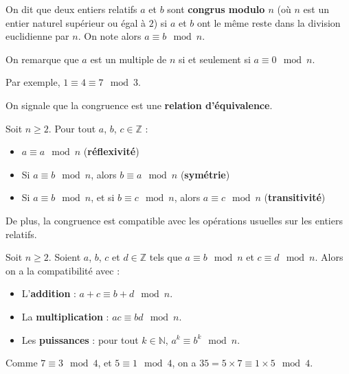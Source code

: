 	\begin{formula}[Définition]
		On dit que deux entiers relatifs $a$ et $b$ sont \textbf{congrus modulo $n$} (où $n$ est un entier naturel supérieur ou égal à $2$) si $a$ et $b$ ont le même reste dans la division euclidienne par $n$. On note alors $a \equiv b \mod n$.
	\end{formula}

	\begin{tip}
		On remarque que $a$ est un multiple de $n$ si et seulement si $a \equiv 0 \mod n$.
	\end{tip}

	\begin{tip}[Exemple]
		Par exemple, $1 \equiv 4 \equiv 7 \mod 3$.
	\end{tip}

	On signale que la congruence est une \textbf{relation d'équivalence}.

	\begin{formula}[Propriétés]
		Soit $n \geq 2$. Pour tout $a$, $b$, $c \in \mathbb{Z}$ :
		\begin{itemize}
			\item $a \equiv a \mod n$ (\textbf{réflexivité})
			\item Si $a \equiv b \mod n$, alors $b \equiv a \mod n$ (\textbf{symétrie})
			\item Si $a \equiv b \mod n$, et si $b \equiv c \mod n$, alors $a \equiv c \mod n$ (\textbf{transitivité})
		\end{itemize}
	\end{formula}

	De plus, la congruence est compatible avec les opérations usuelles sur les entiers relatifs.

	\begin{formula}[Propriétés]
		Soit $n \geq 2$. Soient $a$, $b$, $c$ et $d \in \mathbb{Z}$ tels que $a \equiv b \mod n$ et $c \equiv d \mod n$. Alors on a la compatibilité avec :
		\begin{itemize}
			\item L'\textbf{addition} : $a + c \equiv b + d \mod n$.
			\item La \textbf{multiplication} : $ac \equiv bd \mod n$.
			\item Les \textbf{puissances} : pour tout $k \in \mathbb{N}$, $a^k \equiv b^k \mod n$.
		\end{itemize}
	\end{formula}

	\begin{tip}[Exemple]
		Comme $7 \equiv 3 \mod 4$, et $5 \equiv 1 \mod 4$, on a $35 = 5 \times 7 \equiv 1 \times 5 \mod 4$.
	\end{tip}


